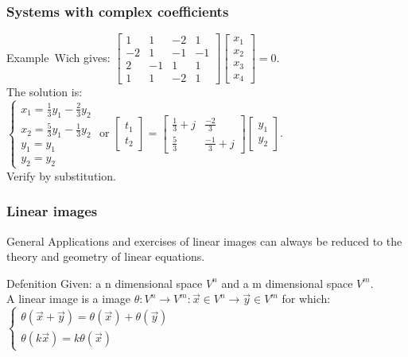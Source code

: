 \begin{frame}
	\frametitle{Systems with complex coefficients}
	\begin{block}{Example}\
		Wich gives: $\begin{bmatrix}
		1 & 1 & -2 & 1\\
		-2 & 1 & -1 & -1 \\
		2 & -1 & 1 & 1\\
		1 & 1 & -2 & 1
		\end{bmatrix}\begin{bmatrix}
		x_1\\x_2\\x_3\\x_4
		\end{bmatrix}=0$. \\
		The solution is: \\
		$\begin{cases}
		x_1=\frac{1}{3}y_1-\frac{2}{3}y_2\\
		x_2=\frac{5}{3}y_1-\frac{1}{3}y_2\\
		y_1=y_1\\y_2=y_2
		\end{cases}$ or $\begin{bmatrix}
		t_1\\t_2
		\end{bmatrix}=\begin{bmatrix}
		\frac{1}{3}+j & \frac{-2}{3}\\
		\frac{5}{3} & \frac{-1}{3}+j
		\end{bmatrix}\begin{bmatrix}
		y_1\\y_2
		\end{bmatrix}$. \\
		Verify by substitution. 
	\end{block}
\end{frame}

\begin{frame}
	\frametitle{Linear images}
	\begin{block}{General}
		Applications and exercises of linear images can always be reduced to the theory and geometry of linear equations.
	\end{block}
	\begin{block}{Defenition}
		Given: a n dimensional space $V^n$ and a m dimensional space $V^m$. \\
		A linear image is a image $\theta: V^n \rightarrow V^m:\overrightarrow{x}\in V^n \rightarrow \overrightarrow{y} \in V^m$ for which: $\begin{cases}
			\theta(\overrightarrow{x}+\overrightarrow{y})=\theta(\overrightarrow{x})+\theta(\overrightarrow{y})\\
			\theta(k\overrightarrow{x})=k\theta(\overrightarrow{x})
		\end{cases}$
	\end{block}
\end{frame}

